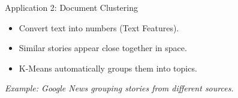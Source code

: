 \begin{frame}{Application 2: Document Clustering}
\begin{tcolorbox}[colback=yellow!5, colframe=orange!40, title=\textbf{Process}]
\begin{itemize}
    \item Convert text into numbers (Text Features).
    \item Similar stories appear close together in space.
    \item K-Means automatically groups them into topics.
\end{itemize}
\end{tcolorbox}

\centering
\small \textit{Example: Google News grouping stories from different sources.}

\end{frame}

